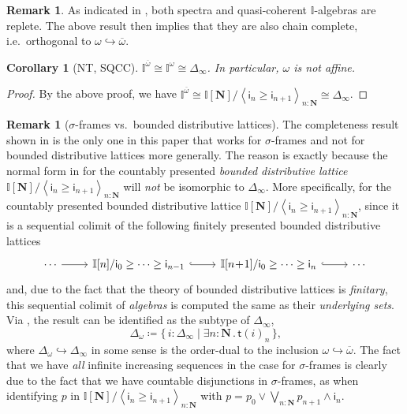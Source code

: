 \documentclass[a4paper,12pt]{amsart}
\newtheorem{corollary}[theorem]{Corollary}
\theoremstyle{definition}
\newtheorem{remark}[theorem]{Remark}
\newcommand{\mb}[1]{\mathbf{#1}}
\newcommand{\mbb}[1]{\mathbb{#1}}
\newcommand{\I}{\mbb I}
\newcommand{\ms}[1]{\mathsf{#1}}
\newcommand{\ov}[1]{\overline{#1}}
\newcommand{\pair}[1]{\left\langle#1\right\rangle}
\newcommand{\scomp}[2]{\{\,#1\mid#2\,\}}
\newcommand{\hook}{\hookrightarrow}
\newcommand{\N}{\mb N}
\newcommand{\ex}[2]{\exists #1\!\colon\!\!#2\mathpunct{.}}
\newcommand\istsym{\ms{t}}
\newcommand\ist[1]{\istsym(#1)}
\begin{document}
\begin{remark}
  As indicated in , both spectra and quasi-coherent $\I$-algebras are replete. The above result then implies that they are also chain complete, i.e.\ orthogonal to $\omega\hook\ov\omega$.
\end{remark}

\begin{corollary}[NT, SQCC]
  $\I^{\ov\omega} \cong \I^\omega \cong \Delta_\infty$. In particular, $\omega$ is not affine.
\end{corollary}
\begin{proof}
  By the above proof, we have $\I^{\ov\omega} \cong \I[\N]/\pair{\ms{i}_n \ge \ms{i}_{n+1}}_{n:\N} \cong \Delta_\infty$.
\end{proof}

\begin{remark}[$\sigma$-frames vs.\ bounded distributive lattices]\label{rem:whynotdis}
  The completeness result shown in  is the only one in this paper that works for $\sigma$-frames and not for bounded distributive lattices more generally. The reason is exactly because the normal form in  for the countably presented \emph{bounded distributive lattice} $\I[\N]/\pair{\ms{i}_n \ge \ms{i}_{n+1}}_{n:\N}$ will \emph{not} be isomorphic to $\Delta_\infty$. More specifically, for the countably presented bounded distributive lattice $\I[\N]/\pair{\ms{i}_n \ge \ms{i}_{n+1}}_{n:\N}$, since it is a sequential colimit of the following finitely presented bounded distributive lattices
  \[ 
  \begin{tikzcd}
    \cdots \ar[r] & \I[n]/\ms{i}_{0} \ge \cdots \ge \ms{i}_{n-1} \ar[r, hook] & \I[n\!+\!1]/\ms{i}_0 \ge \cdots \ge \ms{i}_n \ar[r, hook] & \cdots
  \end{tikzcd}
  \]
  and, due to the fact that the theory of bounded distributive lattices is \emph{finitary}, this sequential colimit of \emph{algebras} is computed the same as their \emph{underlying sets}. Via , the result can be identified as the subtype of $\Delta_\infty$,
  \[ \Delta_\omega \coloneq \scomp{i : \Delta_\infty}{\ex n\N \ist{i}_n}\text{,} \]
  where $\Delta_\omega \hook \Delta_\infty$ in some sense is the order-dual to the inclusion $\omega\hook\ov\omega$. The fact that we have \emph{all} infinite increasing sequences in the case for $\sigma$-frames is clearly due to the fact that we have countable disjunctions in $\sigma$-frames, as when identifying $p$ in $\I[\N]/\pair{\ms{i}_n \ge \ms{i}_{n+1}}_{n:\N}$ with $p = p_0 \vee \bigvee_{n:\N}p_{n+1}\wedge \ms{i}_n$.
\end{remark}
\end{document}
